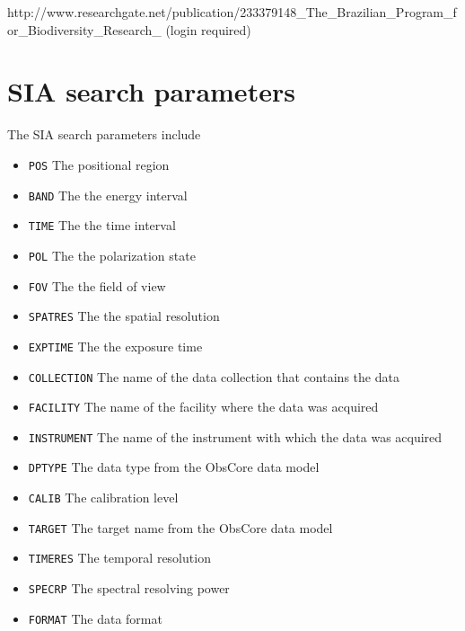\documentclass{article}
\begin{document}
http://www.researchgate.net/publication/233379148_The_Brazilian_Program_for_Biodiversity_Research_%
(login required)










\appendix
\section{SIA search parameters}
\noindent
The SIA search parameters include
\begin{itemize}
  \item \texttt{POS}  The positional region
  \item \texttt{BAND} The the energy interval
  \item \texttt{TIME} The the time interval
  \item \texttt{POL}  The the polarization state
  \item \texttt{FOV}  The the field of view
  \item \texttt{SPATRES} The the spatial resolution
  \item \texttt{EXPTIME} The the exposure time
  \item \texttt{COLLECTION} The name of the data collection that contains the data
  \item \texttt{FACILITY} The name of the facility where the data was acquired
  \item \texttt{INSTRUMENT} The name of the instrument with which the data was acquired
  \item \texttt{DPTYPE} The data type from the ObsCore
   data model
  \item \texttt{CALIB} The calibration level
  \item \texttt{TARGET} The target name from the ObsCore
   data model
  \item \texttt{TIMERES} The temporal resolution
  \item \texttt{SPECRP} The spectral resolving power
  \item \texttt{FORMAT} The data format
\end{itemize}



\theendnotes
\end{document}
